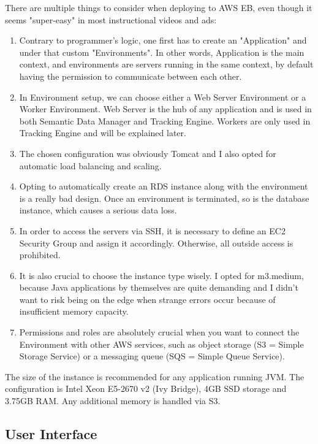 \bigbreak

There are multiple things to consider when deploying to AWS EB, even though it seems "super-easy" in most instructional videos and ads:

\begin{enumerate}
	\item Contrary to programmer's logic, one first has to create an "Application" and under that custom "Environments". In other words, Application is the main context, and environments are servers running in the same context, by default having the permission to communicate between each other.
	\item In Environment setup, we can choose either a Web Server Environment or a Worker Environment. Web Server is the hub of any application and is used in both Semantic Data Manager and Tracking Engine. Workers are only used in Tracking Engine and will be explained later.
	\item The chosen configuration was obviously Tomcat and I also opted for automatic load balancing and scaling.
	\item Opting to automatically create an RDS instance along with the environment is a really bad design. Once an environment is terminated, so is the database instance, which causes a serious data loss.
	\item In order to access the servers via SSH, it is necessary to define an EC2 Security Group and assign it accordingly. Otherwise, all outside access is prohibited.
	\item It is also crucial to choose the instance type wisely. I opted for m3.medium, because Java applications by themselves are quite demanding and I didn't want to risk being on the edge when strange errors occur because of insufficient memory capacity.
	\item Permissions and roles are absolutely crucial when you want to connect the Environment with other AWS services, such as object storage (S3 = Simple Storage Service) or a messaging queue (SQS = Simple Queue Service).
\end{enumerate}

 The size of the instance is recommended for any application running JVM. The configuration is Intel Xeon E5-2670 v2 (Ivy Bridge), 4GB SSD storage and 3.75GB RAM. Any additional memory is handled via S3.

\subsection{User Interface}

